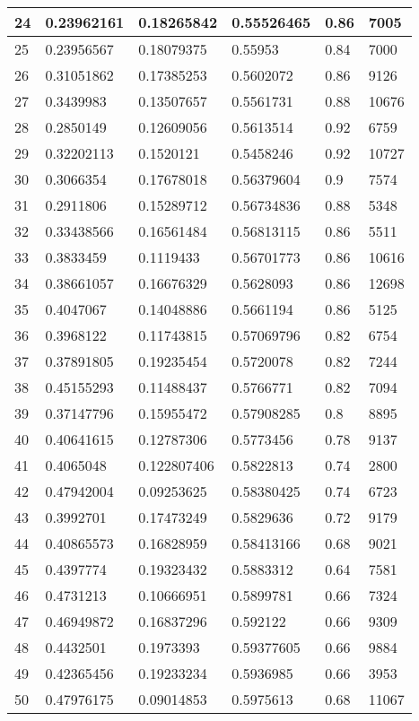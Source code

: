 \begin{longtable}{|l|l|l|l|l|l|}
24 & 0.23962161 & 0.18265842 & 0.55526465 & 0.86 & 7005 \\ \hline 
25 & 0.23956567 & 0.18079375 & 0.55953 & 0.84 & 7000 \\ \hline 
26 & 0.31051862 & 0.17385253 & 0.5602072 & 0.86 & 9126 \\ \hline 
27 & 0.3439983 & 0.13507657 & 0.5561731 & 0.88 & 10676 \\ \hline 
28 & 0.2850149 & 0.12609056 & 0.5613514 & 0.92 & 6759 \\ \hline 
29 & 0.32202113 & 0.1520121 & 0.5458246 & 0.92 & 10727 \\ \hline 
30 & 0.3066354 & 0.17678018 & 0.56379604 & 0.9 & 7574 \\ \hline 
31 & 0.2911806 & 0.15289712 & 0.56734836 & 0.88 & 5348 \\ \hline 
32 & 0.33438566 & 0.16561484 & 0.56813115 & 0.86 & 5511 \\ \hline 
33 & 0.3833459 & 0.1119433 & 0.56701773 & 0.86 & 10616 \\ \hline 
34 & 0.38661057 & 0.16676329 & 0.5628093 & 0.86 & 12698 \\ \hline 
35 & 0.4047067 & 0.14048886 & 0.5661194 & 0.86 & 5125 \\ \hline 
36 & 0.3968122 & 0.11743815 & 0.57069796 & 0.82 & 6754 \\ \hline 
37 & 0.37891805 & 0.19235454 & 0.5720078 & 0.82 & 7244 \\ \hline 
38 & 0.45155293 & 0.11488437 & 0.5766771 & 0.82 & 7094 \\ \hline 
39 & 0.37147796 & 0.15955472 & 0.57908285 & 0.8 & 8895 \\ \hline 
40 & 0.40641615 & 0.12787306 & 0.5773456 & 0.78 & 9137 \\ \hline 
41 & 0.4065048 & 0.122807406 & 0.5822813 & 0.74 & 2800 \\ \hline 
42 & 0.47942004 & 0.09253625 & 0.58380425 & 0.74 & 6723 \\ \hline 
43 & 0.3992701 & 0.17473249 & 0.5829636 & 0.72 & 9179 \\ \hline 
44 & 0.40865573 & 0.16828959 & 0.58413166 & 0.68 & 9021 \\ \hline 
45 & 0.4397774 & 0.19323432 & 0.5883312 & 0.64 & 7581 \\ \hline 
46 & 0.4731213 & 0.10666951 & 0.5899781 & 0.66 & 7324 \\ \hline 
47 & 0.46949872 & 0.16837296 & 0.592122 & 0.66 & 9309 \\ \hline 
48 & 0.4432501 & 0.1973393 & 0.59377605 & 0.66 & 9884 \\ \hline 
49 & 0.42365456 & 0.19233234 & 0.5936985 & 0.66 & 3953 \\ \hline 
50 & 0.47976175 & 0.09014853 & 0.5975613 & 0.68 & 11067 \\ \hline 
\end{longtable}